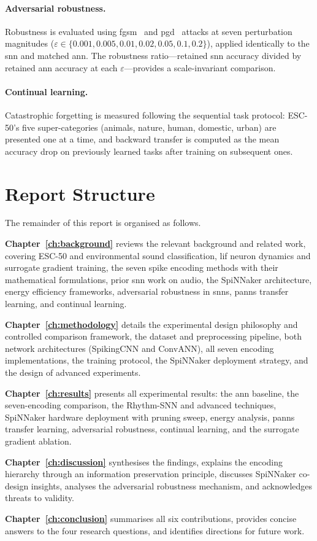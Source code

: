 \paragraph{Adversarial robustness.}
Robustness is evaluated using \gls{fgsm}~\citep{goodfellow2015fgsm} and \gls{pgd}~\citep{madry2018pgd} attacks at seven perturbation magnitudes ($\varepsilon \in \{0.001, 0.005, 0.01, 0.02, 0.05, 0.1, 0.2\}$), applied identically to the \gls{snn} and matched \gls{ann}.
The robustness ratio---retained \gls{snn} accuracy divided by retained \gls{ann} accuracy at each $\varepsilon$---provides a scale-invariant comparison.

\paragraph{Continual learning.}
Catastrophic forgetting is measured following the sequential task protocol: ESC-50's five super-categories (animals, nature, human, domestic, urban) are presented one at a time, and backward transfer is computed as the mean accuracy drop on previously learned tasks after training on subsequent ones.

\section{Report Structure}
\label{sec:report-structure}

The remainder of this report is organised as follows.

\textbf{Chapter~\ref{ch:background}} reviews the relevant background and related work, covering ESC-50 and environmental sound classification, \gls{lif} neuron dynamics and surrogate gradient training, the seven spike encoding methods with their mathematical formulations, prior \gls{snn} work on audio, the SpiNNaker architecture, energy efficiency frameworks, adversarial robustness in \glspl{snn}, \gls{panns} transfer learning, and continual learning.

\textbf{Chapter~\ref{ch:methodology}} details the experimental design philosophy and controlled comparison framework, the dataset and preprocessing pipeline, both network architectures (SpikingCNN and ConvANN), all seven encoding implementations, the training protocol, the SpiNNaker deployment strategy, and the design of advanced experiments.

\textbf{Chapter~\ref{ch:results}} presents all experimental results: the \gls{ann} baseline, the seven-encoding comparison, the Rhythm-SNN and advanced techniques, SpiNNaker hardware deployment with pruning sweep, energy analysis, \gls{panns} transfer learning, adversarial robustness, continual learning, and the surrogate gradient ablation.

\textbf{Chapter~\ref{ch:discussion}} synthesises the findings, explains the encoding hierarchy through an information preservation principle, discusses SpiNNaker co-design insights, analyses the adversarial robustness mechanism, and acknowledges threats to validity.

\textbf{Chapter~\ref{ch:conclusion}} summarises all six contributions, provides concise answers to the four research questions, and identifies directions for future work.
